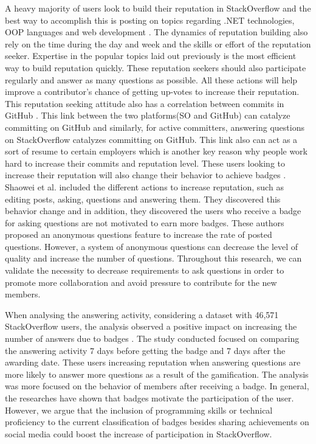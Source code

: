 \documentclass{sigchi}
\begin{document}
A heavy majority of users look to build their reputation in StackOverflow and the best way to accomplish this is posting on topics regarding .NET technologies, OOP languages and web development \cite{Bosu}. The dynamics of reputation building also rely on the time during the day and week and the skills or effort of the reputation seeker. Expertise in the popular topics laid out previously is the most efficient way to build reputation quickly. These reputation seekers should also participate regularly and answer as many questions as possible. All these actions will help improve a contributor's chance of getting up-votes to increase their reputation.  This reputation seeking attitude also has a correlation between commits in GitHub \cite{Vasilescu}. This link between the two platforms(SO and GitHub) can catalyze committing on GitHub and similarly, for active committers, answering questions on StackOverflow catalyzes committing on GitHub. This link also can act as a sort of resume to certain employers which is another key reason why people work hard to increase their commits and reputation level. These users looking to increase their reputation will also change their behavior to achieve badges \cite{Wang}.  Shaowei et al. included the different actions to increase reputation, such as editing posts, asking, questions and answering them. They discovered this behavior change and in addition, they discovered the users who receive a badge for asking questions are not motivated to earn more badges. These authors proposed an anonymous questions feature to increase the rate of posted questions. However, a system of anonymous questions can decrease the level of quality and increase the number of questions. Throughout this research, we can validate the necessity to decrease requirements to ask questions in order to promote more collaboration and avoid pressure to contribute for the new members.

When analysing the answering activity, considering a dataset with 46,571 StackOverflow users, the analysis observed a positive impact on increasing the number of answers due to badges \cite{Cavusoglu}. The study conducted focused on comparing the answering activity 7 days before getting the badge and 7 days after the awarding date. These users increasing reputation when answering questions are more likely to answer more questions as a result of the gamification. The analysis was more focused on the behavior of members after receiving a badge. In general, the researches have shown that badges motivate the participation of the user. However, we argue that the inclusion of programming skills or technical proficiency to the current classification of badges besides sharing achievements on social media could boost the increase of participation in StackOverflow.
\end{document}
